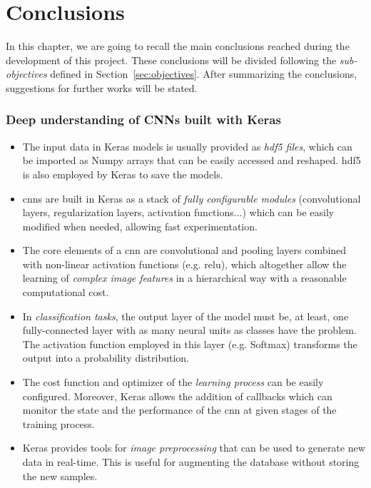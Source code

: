 \chapter{Conclusions}\label{ch:conclusions}
In this chapter, we are going to recall the main conclusions reached during the development of this project. These conclusions will be divided following the \emph{sub-objectives} defined in Section~\ref{sec:objectives}. After summarizing the conclusions, suggestions for further works will be stated.

\subsection*{Deep understanding of CNNs built with Keras}
\begin{itemize}
	\item The input data in Keras models is usually provided as \emph{\gls{hdf5} files}, which can be imported as Numpy arrays that can be easily accessed and reshaped. \gls{hdf5} is also employed by Keras to save the models.
	\item \glspl{cnn} are built in Keras as a stack of \emph{fully configurable modules} (convolutional layers, regularization layers, activation functions...) which can be easily modified when needed, allowing fast experimentation.
	\item The core elements of a \gls{cnn} are convolutional and pooling layers combined with non-linear activation functions (e.g. \gls{relu}), which altogether allow the learning of \emph{complex image features} in a hierarchical way with a reasonable computational cost.
	\item In \emph{classification tasks}, the output layer of the model must be, at least, one fully-connected layer with as many neural units as classes have the problem. The activation function employed in this layer (e.g. Softmax) transforms the output into a probability distribution.
	\item The cost function and optimizer of the \emph{learning process} can be easily configured. Moreover, Keras allows the addition of callbacks which can monitor the state and the performance of the \gls{cnn} at given stages of the training process.
	\item Keras provides tools for \emph{image preprocessing} that can be used to generate new data in real-time. This is useful for augmenting the database without storing the new samples.
\end{itemize}


